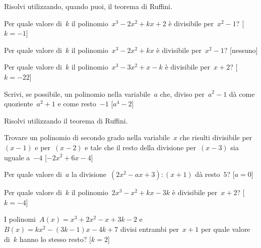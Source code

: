 \begin{esercizio}[\Ast]
\label{ese:div.006}
Risolvi utilizzando, quando puoi, il teorema di Ruffini.
 \begin{enumeratea}
 \item Per quale valore di~$k$ il polinomio~$x^{3}-2x^{2}+kx+2$ 
  è divisibile per~$x^{2}-1$? \hfill[$k=-1$]
 \item Per quale valore di~$k$ il polinomio~$x^{3}-2x^{2}+kx$ 
  è divisibile per~$x^{2}-1$? \hfill[nessuno]
 \item Per quale valore di~$k$ il polinomio~$x^{3}-3x^{2}+x-k$ 
  è divisibile per~$x+2$? \hfill[$k=-22$]
 \item Scrivi, se possibile, un polinomio nella variabile~$a$ che, 
  diviso per~$a^{2}-1$ dà come quoziente~$a^{2}+1$ e come resto~$-1$ 
  \hfill[$a^{4}-2$]
 \end{enumeratea}
\end{esercizio}

\begin{esercizio}[\Ast]
\label{ese:div.007}
Risolvi utilizzando il teorema di Ruffini.
 \begin{enumeratea}
 \item Trovare un polinomio di secondo grado nella variabile~$x$ che risulti 
  divisibile per~$(x-1)$ e per~$(x-2)$ e tale che il resto della divisione 
  per~$(x-3)$ sia uguale a~$-4$ \hfill[$-2x^2+6x-4$]
 \item Per quale valore di~$a$ la 
  divisione~$\left(2x^{2}-ax+3\right):(x+1)$ dà resto~$5$? \hfill[$a=0$]
 \item Per quale valore di~$k$ il 
  polinomio~$2x^{3}-x^{2}+kx-3k$ è divisibile per~$x+2$? \hfill[$k=-4$]
 \item I polinomi~$A(x)=x^3+2x^2-x+3k-2$ e~$B(x)=kx^2-(3k-1)x-4k+7$ 
  divisi entrambi per~$x+1$ per quale valore di~$k$ hanno lo stesso resto? 
  \hfill[$k=2$]
 \end{enumeratea}
\end{esercizio}

\subsubsection*{}


